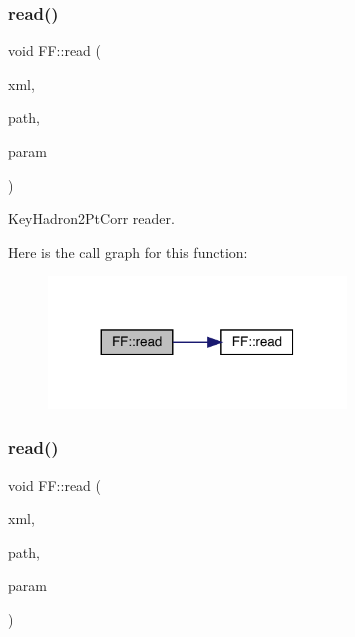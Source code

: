 \subsubsection{\texorpdfstring{read()}{read()}\hspace{0.1cm}{\footnotesize\ttfamily [7/15]}}
{\footnotesize\ttfamily void F\+F\+::read (\begin{DoxyParamCaption}\item[{X\+M\+L\+Reader \&}]{xml,  }\item[{const std\+::string \&}]{path,  }\item[{\mbox{\hyperlink{structFF_1_1KeyHadron2PtCorr__t}{Key\+Hadron2\+Pt\+Corr\+\_\+t}} \&}]{param }\end{DoxyParamCaption})}



Key\+Hadron2\+Pt\+Corr reader. 

Here is the call graph for this function\+:
\nopagebreak
\begin{figure}[H]
\begin{center}
\leavevmode
\includegraphics[width=224pt]{d5/da6/namespaceFF_ac879699f10e046e5a2059a2efcf1408b_cgraph}
\end{center}
\end{figure}
\mbox{\label{namespaceFF_a4e59e8e764d20bb787e2992c247ca80f}} 
\subsubsection{\texorpdfstring{read()}{read()}\hspace{0.1cm}{\footnotesize\ttfamily [8/15]}}
{\footnotesize\ttfamily void F\+F\+::read (\begin{DoxyParamCaption}\item[{X\+M\+L\+Reader \&}]{xml,  }\item[{const std\+::string \&}]{path,  }\item[{\mbox{\hyperlink{structFF_1_1DiscoKeyOperator__t}{Disco\+Key\+Operator\+\_\+t}} \&}]{param }\end{DoxyParamCaption})}



